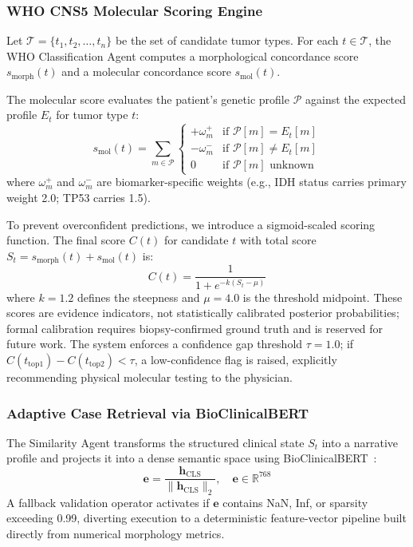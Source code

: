 \documentclass[journal]{IEEEtran}
\begin{document}
\subsubsection{WHO CNS5 Molecular Scoring Engine}

Let $\mathcal{T} = \{t_1, t_2, \ldots, t_n\}$ be the set of candidate
tumor types. For each $t \in \mathcal{T}$, the WHO Classification Agent
computes a morphological concordance score $s_\text{morph}(t)$ and a
molecular concordance score $s_\text{mol}(t)$.

The molecular score evaluates the patient's genetic profile $\mathcal{P}$
against the expected profile $E_t$ for tumor type $t$:
\begin{equation}
  s_\text{mol}(t) = \sum_{m \in \mathcal{P}}
  \begin{cases}
    +\omega_m^+ & \text{if } \mathcal{P}[m] = E_t[m] \\
    -\omega_m^- & \text{if } \mathcal{P}[m] \neq E_t[m] \\
    0            & \text{if } \mathcal{P}[m] \text{ unknown}
  \end{cases}
\end{equation}
where $\omega_m^+$ and $\omega_m^-$ are biomarker-specific weights (e.g.,
IDH status carries primary weight 2.0; TP53 carries 1.5).

To prevent overconfident predictions, we introduce a sigmoid-scaled
scoring function. The final score $C(t)$ for candidate $t$ with total
score $S_t = s_\text{morph}(t) + s_\text{mol}(t)$ is:
\begin{equation}
  C(t) = \frac{1}{1 + e^{-k(S_t - \mu)}}
\end{equation}
where $k = 1.2$ defines the steepness and $\mu = 4.0$ is the threshold
midpoint. These scores are evidence indicators, not statistically
calibrated posterior probabilities; formal calibration requires
biopsy-confirmed ground truth and is reserved for future work. The system
enforces a confidence gap threshold $\tau = 1.0$; if
$C(t_{\text{top1}}) - C(t_{\text{top2}}) < \tau$, a low-confidence flag
is raised, explicitly recommending physical molecular testing to the
physician.

\subsubsection{Adaptive Case Retrieval via BioClinicalBERT}

The Similarity Agent transforms the structured clinical state $S_t$ into a
narrative profile and projects it into a dense semantic space using
BioClinicalBERT~\cite{alsentzer2019}:
\begin{equation}
  \mathbf{e} = \frac{\mathbf{h}_\text{CLS}}{\|\mathbf{h}_\text{CLS}\|_2},
  \quad \mathbf{e} \in \mathbb{R}^{768}
\end{equation}
A fallback validation operator activates if $\mathbf{e}$ contains NaN,
Inf, or sparsity exceeding 0.99, diverting execution to a deterministic
feature-vector pipeline built directly from numerical morphology metrics.
\end{document}

